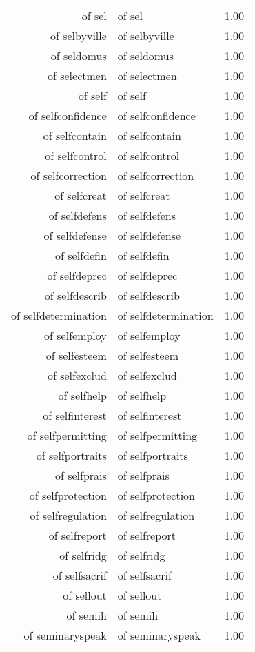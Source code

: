 \begin{table}[ht]
\begin{tabular}{rlr}
  of sel & of sel & 1.00 \\ 
  of selbyville & of selbyville & 1.00 \\ 
  of seldomus & of seldomus & 1.00 \\ 
  of selectmen & of selectmen & 1.00 \\ 
  of self & of self & 1.00 \\ 
  of selfconfidence & of selfconfidence & 1.00 \\ 
  of selfcontain & of selfcontain & 1.00 \\ 
  of selfcontrol & of selfcontrol & 1.00 \\ 
  of selfcorrection & of selfcorrection & 1.00 \\ 
  of selfcreat & of selfcreat & 1.00 \\ 
  of selfdefens & of selfdefens & 1.00 \\ 
  of selfdefense & of selfdefense & 1.00 \\ 
  of selfdefin & of selfdefin & 1.00 \\ 
  of selfdeprec & of selfdeprec & 1.00 \\ 
  of selfdescrib & of selfdescrib & 1.00 \\ 
  of selfdetermination & of selfdetermination & 1.00 \\ 
  of selfemploy & of selfemploy & 1.00 \\ 
  of selfesteem & of selfesteem & 1.00 \\ 
  of selfexclud & of selfexclud & 1.00 \\ 
  of selfhelp & of selfhelp & 1.00 \\ 
  of selfinterest & of selfinterest & 1.00 \\ 
  of selfpermitting & of selfpermitting & 1.00 \\ 
  of selfportraits & of selfportraits & 1.00 \\ 
  of selfprais & of selfprais & 1.00 \\ 
  of selfprotection & of selfprotection & 1.00 \\ 
  of selfregulation & of selfregulation & 1.00 \\ 
  of selfreport & of selfreport & 1.00 \\ 
  of selfridg & of selfridg & 1.00 \\ 
  of selfsacrif & of selfsacrif & 1.00 \\ 
  of sellout & of sellout & 1.00 \\ 
  of semih & of semih & 1.00 \\ 
  of seminaryspeak & of seminaryspeak & 1.00 \\ 

\end{tabular}
\end{table}
